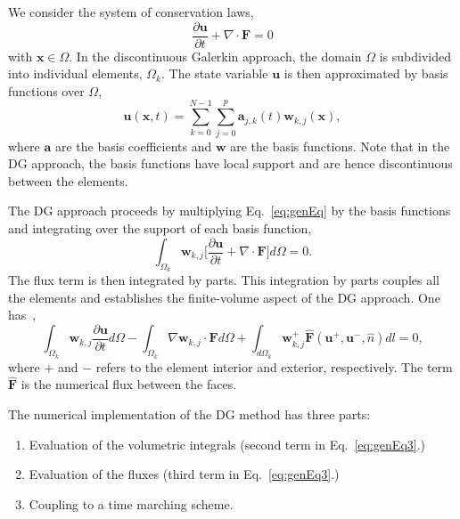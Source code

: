 \documentclass[times,12pt]{article}%
\begin{document}
We consider the system of conservation laws,
\begin{equation}\label{eq:genEq}
\frac{\partial \mathbf{u}}{\partial t} +  \nabla \cdot \mathbf{F} = 0
\end{equation}
with $\mathbf{x} \in \Omega$. In the discontinuous Galerkin approach, the domain $\Omega$ is subdivided into individual elements, $\Omega_k$. The state variable $\mathbf{u}$ is then approximated by basis functions over $\Omega$,
$$\mathbf{u}(\mathbf{x},t) = \sum_{k=0}^{N-1} \sum_{j = 0}^p \mathbf{a}_{j,k}(t) \mathbf{w}_{k,j}(\mathbf{x}),$$
where $\mathbf{a}$ are the basis coefficients and $\mathbf{w}$ are the basis functions. Note that in the DG approach, the basis functions have local support and are hence discontinuous between the elements. 

The DG approach proceeds by multiplying Eq.~\ref{eq:genEq} by the basis functions and integrating over the support of each basis function,
\begin{equation}\label{eq:genEq2}
\int_{\Omega_k} \mathbf{w}_{k,j} \bigg[\frac{\partial \mathbf{u}}{\partial t}  +  \nabla \cdot \mathbf{F} \bigg] d\Omega = 0.
\end{equation}
The flux term is then integrated by parts. This integration by parts couples all the elements and establishes the finite-volume aspect of the DG approach. One has~\cite{kfid_cfdnotes},
\begin{equation}\label{eq:genEq3}
\int_{\Omega_k} \mathbf{w}_{k,j}\frac{\partial \mathbf{u}}{\partial t} d\Omega   - \int_{\Omega_k} \nabla \mathbf{w}_{k,j} \cdot \mathbf{F}  d\Omega  + \int_{d \Omega_k} \mathbf{w}_{k,j}^+ \hat{\mathbf{F}} (\mathbf{u}^+,\mathbf{u}^-, \hat{n}) dl  = 0,
\end{equation}
where $+$ and $-$ refers to the element interior and exterior, respectively. The term $ \hat{\mathbf{F}} $ is the numerical flux between the faces. 

The numerical implementation of the DG method has three parts:
\begin{enumerate}
\item Evaluation of the volumetric integrals (second term in Eq.~\ref{eq:genEq3}.)
\item Evaluation of the fluxes (third term in Eq.~\ref{eq:genEq3}.)
\item Coupling to a time marching scheme.
\end{enumerate}
\end{document}
